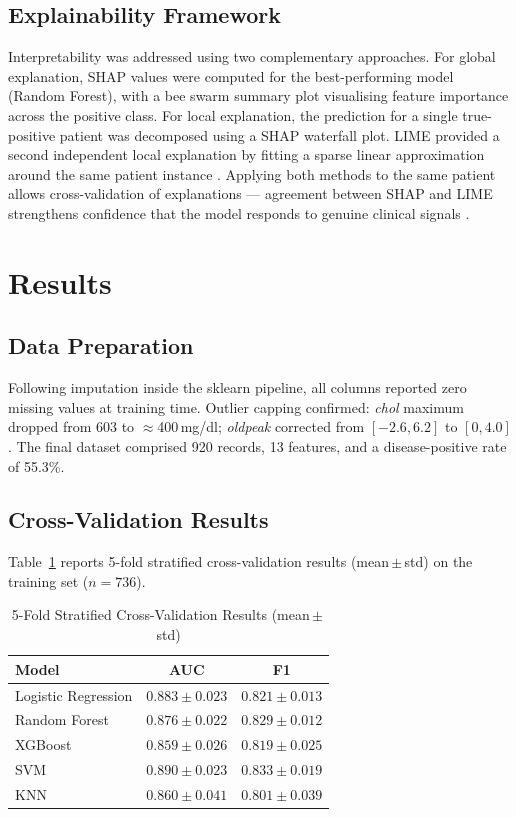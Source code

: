 \documentclass[conference]{IEEEtran}
\begin{document}
\subsection{Explainability Framework}
Interpretability was addressed using two complementary approaches. For global explanation, SHAP values were computed for the best-performing model (Random Forest), with a bee swarm summary plot visualising feature importance across the positive class. For local explanation, the prediction for a single true-positive patient was decomposed using a SHAP waterfall plot. LIME provided a second independent local explanation by fitting a sparse linear approximation around the same patient instance \cite{ribeiro2016}. Applying both methods to the same patient allows cross-validation of explanations — agreement between SHAP and LIME strengthens confidence that the model responds to genuine clinical signals \cite{ozdemir2024}.

\section{Results}

\subsection{Data Preparation}
Following imputation inside the sklearn pipeline, all columns reported zero missing values at training time. Outlier capping confirmed: \textit{chol} maximum dropped from 603 to $\approx$400\,mg/dl; \textit{oldpeak} corrected from $[-2.6, 6.2]$ to $[0, 4.0]$. The final dataset comprised 920 records, 13 features, and a disease-positive rate of 55.3\%.

\subsection{Cross-Validation Results}
Table~\ref{tab:cv} reports 5-fold stratified cross-validation results (mean\,$\pm$\,std) on the training set ($n{=}736$).

\begin{table}[htbp]
\caption{5-Fold Stratified Cross-Validation Results (mean\,$\pm$\,std)}
\label{tab:cv}
\centering
\renewcommand{\arraystretch}{1.2}
\begin{tabular}{lcc}
\toprule
\textbf{Model} & \textbf{AUC} & \textbf{F1} \\
\midrule
Logistic Regression & $0.883 \pm 0.023$ & $0.821 \pm 0.013$ \\
Random Forest       & $0.876 \pm 0.022$ & $0.829 \pm 0.012$ \\
XGBoost             & $0.859 \pm 0.026$ & $0.819 \pm 0.025$ \\
SVM                 & $0.890 \pm 0.023$ & $0.833 \pm 0.019$ \\
KNN                 & $0.860 \pm 0.041$ & $0.801 \pm 0.039$ \\
\bottomrule
\end{tabular}
\end{table}
\end{document}
